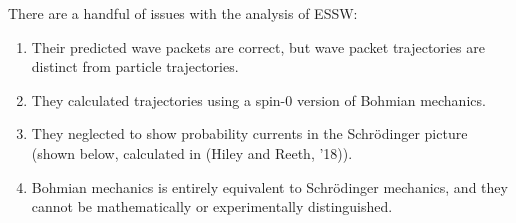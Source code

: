 \documentclass[compress,10pt,usenames,dvipsnames]{beamer}
\theoremstyle{remark}
\begin{document}
\begin{frame}\small
	There are a handful of issues with the analysis of ESSW:
	\begin{enumerate}\small
		\item<1-4> Their predicted wave packets are correct, but wave packet trajectories are distinct from particle trajectories.
		\item<2-4> They calculated trajectories using a spin-0 version of Bohmian mechanics.
		\item<3-4> They neglected to show probability currents in the Schrödinger picture (shown below, calculated in (Hiley and Reeth, '18)).
		\item<4> Bohmian mechanics is entirely equivalent to Schrödinger mechanics, and they cannot be mathematically or experimentally distinguished.
	\end{enumerate}

\end{frame}
\end{document}
